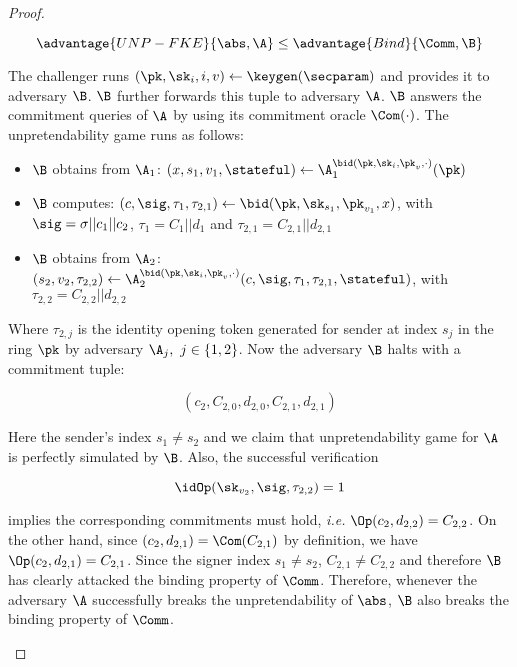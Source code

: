 \begin{proof}
\begin{description}
    \begin{equation*}
        \advantage{UNP-FKE}{\abs, \A} \leq \advantage{Bind}{\Comm, \B}
    \end{equation*}
    
    The challenger runs $(\pk,\sk_i,i,v) \gets \keygen(\secparam)$ and provides it to adversary $\B$. $\B$ further forwards this tuple to adversary $\A$. $\B$ answers the commitment queries of $\A$ by using its commitment oracle $\Com(\cdot)$. The unpretendability game runs as follows:
    \begin{itemize}
    \item $\B$ obtains from $\A_1$: $(x, s_1, v_1, \stateful) \gets \A_1^{\bid(\pk, \sk_i, \pk_v, \cdot)} (\pk)$
    \item $\B$ computes: $(c, \sig, \tau_1, \tau_{2,1}) \gets \bid(\pk, \sk_{s_1}, \pk_{v_1}, x)$, with $\sig = \sigma || c_1 || c_2$, $\tau_1 = C_1 || d_1$ and $\tau_{2,1} = C_{2,1} || d_{2,1}$
    \item $\B$ obtains from $\A_2$: $(s_2, v_2, \tau_{2,2}) \gets \A_2^{\bid(\pk,\sk_i,\pk_v,\cdot)}(c, \sig, \tau_1, \tau_{2,1}, \stateful)$, with $\tau_{2,2} = C_{2,2} || d_{2,2}$
    \end{itemize}
    Where $\tau_{2,j}$ is the identity opening token generated for sender at index $s_j$ in the ring $\pk$ by adversary $\A_j, ~j \in \{1,2\}$. Now the adversary $\B$ halts with a commitment tuple:
    
    \begin{equation*}
        (c_2, C_{2,0}, d_{2,0}, C_{2,1}, d_{2,1})
    \end{equation*}
    
    Here the sender's index $s_1 \neq s_2$ and we claim that unpretendability game for $\A$ is perfectly simulated by $\B$. Also, the successful verification
    
    \begin{equation*}
        \idOp(\sk_{v_2}, \sig, \tau_{2,2}) = 1
    \end{equation*}
    
implies the corresponding commitments must hold, \textit{i.e.} $\Op(c_2, d_{2,2}) = C_{2,2}$. On the other hand, since $(c_2, d_{2,1}) = \Com(C_{2,1})$ by definition, we have $\Op(c_2, d_{2,1})=C_{2,1}$. Since the signer index $s_1 \neq s_2$, $C_{2,1} \neq C_{2,2}$ and therefore $\B$ has clearly attacked the binding property of $\Comm$. Therefore, whenever the adversary $\A$ successfully breaks the unpretendability of $\abs$, $\B$ also breaks the binding property of $\Comm$.


\end{description}
\end{proof}
